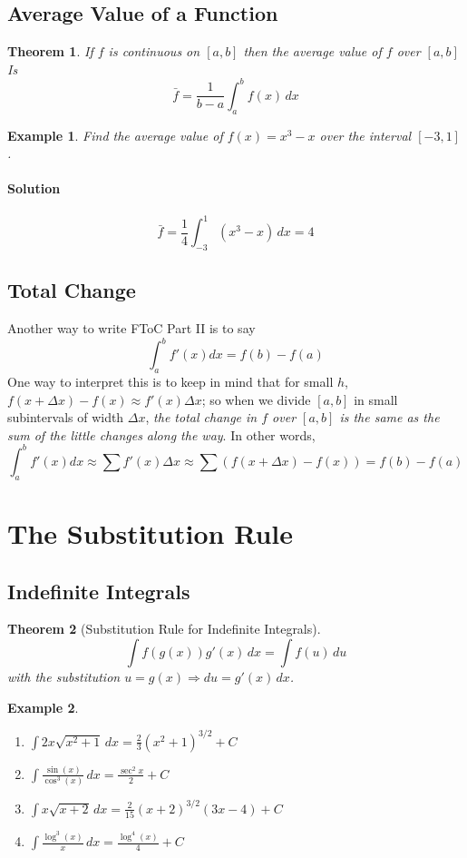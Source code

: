 \documentclass[letterpaper, 11pt, openany]{book}
\theoremstyle{mytheoremstyle}
\newtheorem{theorem}{Theorem}[section]
\theoremstyle{myexamplestyle}
\newtheorem{example}{Example}[section]
\newenvironment{solution}{\paragraph{\sffamily \smaller \fontseries{b}\selectfont Solution}}{\hfill\faSquare}
\begin{document}
\subsection{Average Value of a Function}
\begin{theorem}\label{t:avg-value-of-f}
    If \(f\) is continuous on \([a,b]\) then the average value of \(f\) over \([a,b]\) Is
    \[\bar{f} = \frac{1}{b-a} \int_a^b f(x) \, dx\]
\end{theorem}

\begin{example}
    Find the average value of \(f(x) = x^3 - x\) over the interval \([-3, 1] \).
    \begin{solution}
        \[\bar{f} = \frac{1}{4} \int_{-3}^{1} \left(x^3 - x\right) \, dx = 4\]
    \end{solution}
\end{example}

\subsection{Total Change}
Another way to write FToC Part II is to say
\[\int_a^b f'(x) dx = f(b) - f(a)\]
One way to interpret this is to keep in mind that for small \(h\), \(f(x+\Delta x) - f(x) \approx f'(x)\Delta x\); so when we divide \([a,b]\) in small subintervals of width \(\Delta x\), \textit{the total change in \(f\) over \([a,b]\) is the same as the sum of the little changes along the way}. In other words,
\[\int_a^b f'(x) dx \approx \sum f'(x) \Delta x \approx \sum \left(f(x+\Delta x) - f(x)\right)= f(b) - f(a)\]
\section{The Substitution Rule}

\subsection{Indefinite Integrals}

\begin{theorem}[Substitution Rule for Indefinite Integrals]\label{t:sub-rule-indef-int}
    \[\int f(g(x))g'(x)\, dx = \int f(u) \, du\]
    with the substitution \(u=g(x) \Rightarrow du = g'(x) \, dx\).
\end{theorem}

\begin{example}
    \begin{enumerate}
        \item \(\displaystyle \int 2 x \sqrt{x^2+1} \, dx = \frac{2}{3} \left(x^2+1\right)^{3/2} + C\)
        \item \(\displaystyle \int \frac{\sin (x)}{\cos ^3(x)} \, dx = \frac{\sec ^2 x}{2} + C\)
        \item \(\displaystyle \int x \sqrt{x+2} \, dx = \frac{2}{15} (x+2)^{3/2} (3 x-4) + C\)
        \item \(\displaystyle \int \frac{\log ^3(x)}{x} \, dx = \frac{\log ^4(x)}{4} + C\)
    \end{enumerate}
\end{example}
\end{document}
